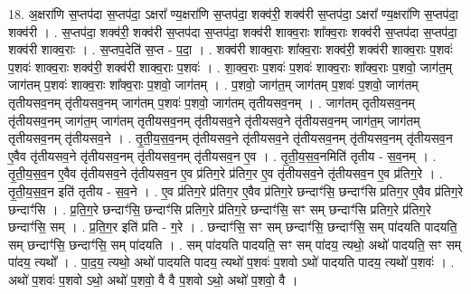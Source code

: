 \documentclass[17pt]{extarticle}
\begin{document}
18. अ॒क्षरा॑णि स॒प्तप॑दा स॒प्तप॑दा॒ ऽक्षरा᳚ ण्य॒क्षरा॑णि स॒प्तप॑दा॒ शक्व॑री॒ शक्व॑री 
स॒प्तप॑दा॒ ऽक्षरा᳚ ण्य॒क्षरा॑णि स॒प्तप॑दा॒ शक्व॑री । . स॒प्तप॑दा॒ शक्व॑री॒ शक्व॑री स॒प्तप॑दा स॒प्तप॑दा॒ शक्व॑री शाक्व॒राः शा᳚क्व॒राः शक्व॑री स॒प्तप॑दा स॒प्तप॑दा॒ शक्व॑री शाक्व॒राः । . स॒प्तप॒देति॑ स॒प्त - प॒दा॒ । . शक्व॑री शाक्व॒राः शा᳚क्व॒राः शक्व॑री॒ शक्व॑री शाक्व॒राः प॒शवः॑ प॒शवः॑ शाक्व॒राः शक्व॑री॒ शक्व॑री शाक्व॒राः प॒शवः॑ । . शा॒क्व॒राः प॒शवः॑ प॒शवः॑ शाक्व॒राः शा᳚क्व॒राः प॒शवो॒ जाग॑त॒म् जाग॑तम् प॒शवः॑ शाक्व॒राः शा᳚क्व॒राः प॒शवो॒ जाग॑तम् । . प॒शवो॒ जाग॑त॒म् जाग॑तम् प॒शवः॑ प॒शवो॒ जाग॑तम् तृतीयसव॒नम् तृ॑तीयसव॒नम् जाग॑तम् प॒शवः॑ प॒शवो॒ जाग॑तम् तृतीयसव॒नम् । . जाग॑तम् तृतीयसव॒नम् तृ॑तीयसव॒नम् जाग॑त॒म् जाग॑तम् तृतीयसव॒नम् तृ॑तीयसव॒ने तृ॑तीयसव॒ने तृ॑तीयसव॒नम् जाग॑त॒म् जाग॑तम् तृतीयसव॒नम् तृ॑तीयसव॒ने । . तृ॒ती॒य॒स॒व॒नम् तृ॑तीयसव॒ने तृ॑तीयसव॒ने तृ॑तीयसव॒नम् तृ॑तीयसव॒नम् तृ॑तीयसव॒न ए॒वैव तृ॑तीयसव॒ने तृ॑तीयसव॒नम् तृ॑तीयसव॒नम् तृ॑तीयसव॒न ए॒व । . तृ॒ती॒य॒स॒व॒नमिति॑ तृतीय - स॒व॒नम् । . तृ॒ती॒य॒स॒व॒न ए॒वैव तृ॑तीयसव॒ने तृ॑तीयसव॒न ए॒व प्र॑तिग॒रे प्र॑तिग॒र ए॒व तृ॑तीयसव॒ने तृ॑तीयसव॒न ए॒व प्र॑तिग॒रे । . तृ॒ती॒य॒स॒व॒न इति॑ तृतीय - स॒व॒ने । . ए॒व प्र॑तिग॒रे प्र॑तिग॒र ए॒वैव प्र॑तिग॒रे छन्दाꣳ॑सि॒ छन्दाꣳ॑सि प्रतिग॒र ए॒वैव प्र॑तिग॒रे छन्दाꣳ॑सि । . प्र॒ति॒ग॒रे छन्दाꣳ॑सि॒ छन्दाꣳ॑सि प्रतिग॒रे प्र॑तिग॒रे छन्दाꣳ॑सि॒ सꣳ सम् छन्दाꣳ॑सि प्रतिग॒रे प्र॑तिग॒रे छन्दाꣳ॑सि॒ सम् । . प्र॒ति॒ग॒र इति॑ प्रति - ग॒रे । . छन्दाꣳ॑सि॒ सꣳ सम् छन्दाꣳ॑सि॒ छन्दाꣳ॑सि॒ सम् पा॑दयति पादयति॒ सम् छन्दाꣳ॑सि॒ छन्दाꣳ॑सि॒ सम् पा॑दयति । . सम् पा॑दयति पादयति॒ सꣳ सम् पा॑दय॒ त्यथो॒ अथो॑ पादयति॒ सꣳ सम् पा॑दय॒ त्यथो᳚ । . पा॒द॒य॒ त्यथो॒ अथो॑ पादयति पादय॒ त्यथो॑ प॒शवः॑ प॒शवो ऽथो॑ पादयति पादय॒ त्यथो॑ प॒शवः॑ । . अथो॑ प॒शवः॑ प॒शवो ऽथो॒ अथो॑ प॒शवो॒ वै वै प॒शवो ऽथो॒ अथो॑ प॒शवो॒ वै । \newline
\end{document}
